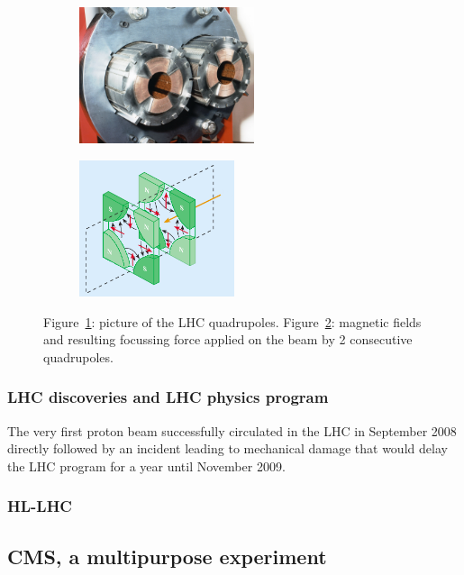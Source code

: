 	\begin{figure}[H]
		\begin{subfigure}{0.5\linewidth}
			\centering
			\includegraphics[height = 4cm]{fig/chapt2/LHC-quadrupole.jpg}
			\caption{\label{fig:LHCQuadrupole:A}}
		\end{subfigure}
		\begin{subfigure}{0.5\linewidth}
			\centering
			\includegraphics[height = 4cm]{fig/chapt2/LHC-quadrupole-field.png}
			\caption{\label{fig:LHCQuadrupole:B}}
		\end{subfigure}
		\caption{\label{fig:LHCQuadrupole} Figure~\ref{fig:LHCQuadrupole:A}: picture of the LHC quadrupoles. Figure~\ref{fig:LHCQuadrupole:B}: magnetic fields and resulting focussing force applied on the beam by 2 consecutive quadrupoles.}
	\end{figure}
	
		\subsubsection{LHC discoveries and LHC physics program}
		\label{chapt2:sssec:discovery}
		
	The very first proton beam successfully circulated in the LHC in September 2008 directly followed by an incident leading to mechanical damage that would delay the LHC program for a year until November 2009.
	
		\subsubsection{\acl{HL-LHC}}
		\label{chapt2:sssec:HL-LHC}

	\subsection{CMS, a multipurpose experiment}
	\label{chapt2:ssec:CMS}

